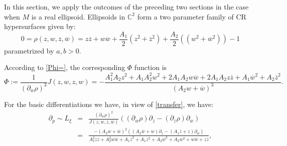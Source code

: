 \documentclass[12pt]{amsart}
\def\CC{\mathbb{C}}
\begin{document}
In this section, we apply the outcomes of the preceding two sections in the case when $M$ is a real ellipsoid. Ellipsoids in $\CC^{2}$ form a two parameter family of CR hypersurfaces  given by:
$$
0=\rho(z,w,\overline{z},\overline{w})=z\overline{z}+w\overline{w}+\frac{A_1}{2}(z^2+\overline{z}^2)+\frac{A_2}{2}((w^2+\overline{w}^2))-1 
$$
parametrized by $a,b>0.$ 

According to \eqref{Phi=}, the corresponding $\Phi$ function is
$$\Phi:=\frac{1}{(\partial_w \rho)^3}J(z,w,z,w)=-\frac{A_1^2 A_2 z^2+A_1 A_2^2 w^2+2 A_1 A_2 w\overline{w}+2 A_1 A_2 z\overline{z}+A_1\overline{w}^2+A_2\overline{z}^2}{(A_2 w+\overline{w})^3}.$$

For the basic differentiations we have, in view of \eqref{transfer}, we have:
\begin{eqnarray*}
\partial_p\sim L_\xi&=&\frac{(\partial_w \rho)^2}{J(z,w,\overline{z},\overline{w})}((\partial_{\overline{w}} \rho)\partial_{\overline{z}}-(\partial_{\overline{z}} \rho)\partial_{\overline{w}})\\
&=&\frac{-(A_2 w+\overline{w})^2 ((A_2 \overline{w}+w)\partial_{\overline{z}}-(A_1\overline{z}+z)\partial_{\overline{w}})}{A_1^2 z\overline{z}+A_2^2 w\overline{w}+A_1\overline{z}^2+A_1z^2+A_2\overline{w}^2+A_2 w^2+w\overline{w}+z\overline{z}},\\
\end{eqnarray*}
\end{document}
